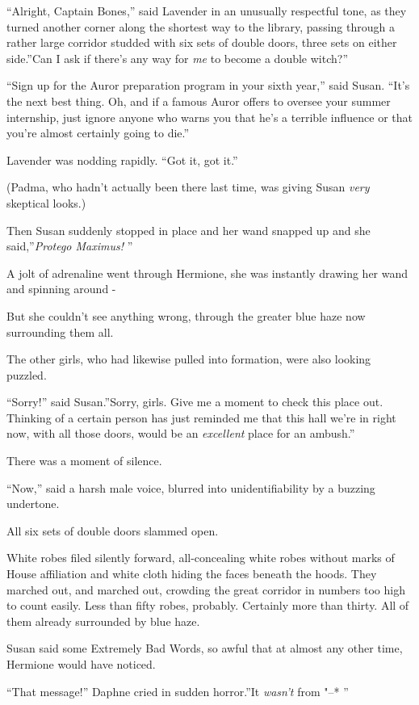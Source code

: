 ``Alright, Captain Bones,'' said Lavender in an unusually respectful
tone, as they turned another corner along the shortest way to the
library, passing through a rather large corridor studded with six sets
of double doors, three sets on either side.''Can I ask if there's any
way for \emph{me} to become a double witch?''

``Sign up for the Auror preparation program in your sixth year,'' said
Susan. ``It's the next best thing. Oh, and if a famous Auror offers to
oversee your summer internship, just ignore anyone who warns you that
he's a terrible influence or that you're almost certainly going to
die.''

Lavender was nodding rapidly. ``Got it, got it.''

(Padma, who hadn't actually been there last time, was giving Susan
\emph{very} skeptical looks.)

Then Susan suddenly stopped in place and her wand snapped up and she
said,''\emph{Protego Maximus!} ''

A jolt of adrenaline went through Hermione, she was instantly drawing
her wand and spinning around -

But she couldn't see anything wrong, through the greater blue haze now
surrounding them all.

The other girls, who had likewise pulled into formation, were also
looking puzzled.

``Sorry!'' said Susan.''Sorry, girls. Give me a moment to check this
place out. Thinking of a certain person has just reminded me that this
hall we're in right now, with all those doors, would be an
\emph{excellent} place for an ambush.''

There was a moment of silence.

``Now,'' said a harsh male voice, blurred into unidentifiability by a
buzzing undertone.

All six sets of double doors slammed open.

White robes filed silently forward, all-concealing white robes without
marks of House affiliation and white cloth hiding the faces beneath the
hoods. They marched out, and marched out, crowding the great corridor in
numbers too high to count easily. Less than fifty robes, probably.
Certainly more than thirty. All of them already surrounded by blue haze.

Susan said some Extremely Bad Words, so awful that at almost any other
time, Hermione would have noticed.

``That message!'' Daphne cried in sudden horror.''It \emph{wasn't} from
"--* ''

